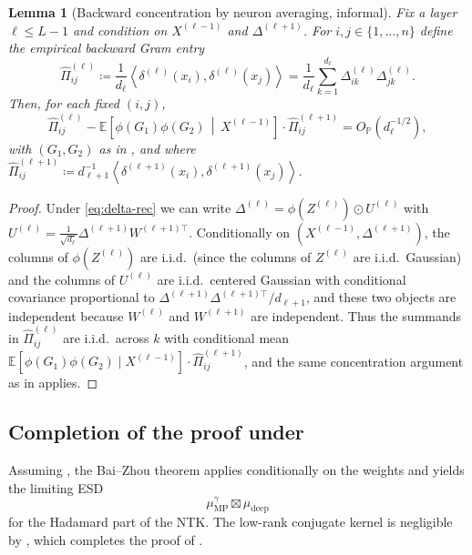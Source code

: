 \documentclass[11pt]{article}
\newcommand{\EE}{\mathbb{E}}
\newcommand{\PP}{\mathbb{P}}
\newcommand{\ip}[2]{\left\langle #1,#2\right\rangle}
\newtheorem{lemma}{Lemma}
\begin{document}
\begin{lemma}[Backward concentration by neuron averaging, informal]\label{lem:backward-neuron-conc}
Fix a layer $\ell\le L-1$ and condition on $X^{(\ell-1)}$ and $\Delta^{(\ell+1)}$.
For $i,j\in\{1,\dots,n\}$ define the empirical backward Gram entry
\[
  \widehat{\Pi}^{(\ell)}_{ij}\coloneqq \frac{1}{d_\ell}\ip{\delta^{(\ell)}(x_i)}{\delta^{(\ell)}(x_j)}=\frac{1}{d_\ell}\sum_{k=1}^{d_\ell}\Delta^{(\ell)}_{ik}\Delta^{(\ell)}_{jk}.
\]
Then, for each fixed $(i,j)$,
\[
  \widehat{\Pi}^{(\ell)}_{ij}-\EE\!\left[\phi(G_1)\phi(G_2)\,\middle|\,X^{(\ell-1)}\right]\cdot \widehat{\Pi}^{(\ell+1)}_{ij}
  =
  O_{\PP}\!\left(d_\ell^{-1/2}\right),
\]
with $(G_1,G_2)$ as in , and where $\widehat{\Pi}^{(\ell+1)}_{ij}\coloneqq d_{\ell+1}^{-1}\ip{\delta^{(\ell+1)}(x_i)}{\delta^{(\ell+1)}(x_j)}$.
\end{lemma}
\begin{proof}
Under \eqref{eq:delta-rec} we can write $\Delta^{(\ell)}=\phi(Z^{(\ell)})\odot U^{(\ell)}$ with $U^{(\ell)}=\frac{1}{\sqrt{d_\ell}}\Delta^{(\ell+1)}W^{(\ell+1)\top}$.
Conditionally on $(X^{(\ell-1)},\Delta^{(\ell+1)})$, the columns of $\phi(Z^{(\ell)})$ are i.i.d.\ (since the columns of $Z^{(\ell)}$ are i.i.d.\ Gaussian) and the columns of $U^{(\ell)}$ are i.i.d.\ centered Gaussian with conditional covariance proportional to $\Delta^{(\ell+1)}\Delta^{(\ell+1)\top}/d_{\ell+1}$, and these two objects are independent because $W^{(\ell)}$ and $W^{(\ell+1)}$ are independent.
Thus the summands in $\widehat{\Pi}^{(\ell)}_{ij}$ are i.i.d.\ across $k$ with conditional mean $\EE[\phi(G_1)\phi(G_2)\mid X^{(\ell-1)}]\cdot \widehat{\Pi}^{(\ell+1)}_{ij}$, and the same concentration argument as in  applies.
\end{proof}

\subsection*{Completion of the proof under }
Assuming , the Bai--Zhou theorem applies conditionally on the weights and yields the limiting ESD
\[
  \mu_{\mathrm{MP}}^{\gamma}\boxtimes \mu_{\mathrm{deep}}
\]
for the Hadamard part of the NTK.
The low-rank conjugate kernel is negligible by , which completes the proof of .
\end{document}
